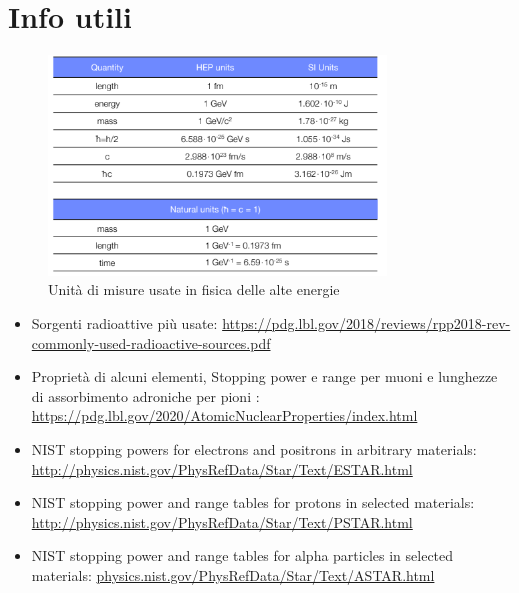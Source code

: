 \chapter{Info utili}

\begin{figure}[H]
    \centering
    \includegraphics[width=0.8\textwidth]{./Chapters/images/Appendice/image-20220214164823650.png}
    \caption{Unità di misure usate in fisica delle alte energie}
    \label{fig:}
\end{figure}




\begin{itemize}
    \item Sorgenti radioattive più usate: \url{https://pdg.lbl.gov/2018/reviews/rpp2018-rev-commonly-used-radioactive-sources.pdf}
    \item Proprietà di alcuni elementi, Stopping power e range per muoni  e lunghezze di assorbimento adroniche per pioni : \url{https://pdg.lbl.gov/2020/AtomicNuclearProperties/index.html} 
    \item NIST stopping powers for electrons and positrons in arbitrary materials: \url{http://physics.nist.gov/PhysRefData/Star/Text/ESTAR.html}
    \item NIST stopping power and range tables for protons in selected materials: \url{http://physics.nist.gov/PhysRefData/Star/Text/PSTAR.html}
    \item NIST stopping power and range tables for alpha particles in selected materials: \url{physics.nist.gov/PhysRefData/Star/Text/ASTAR.html}
\end{itemize}

